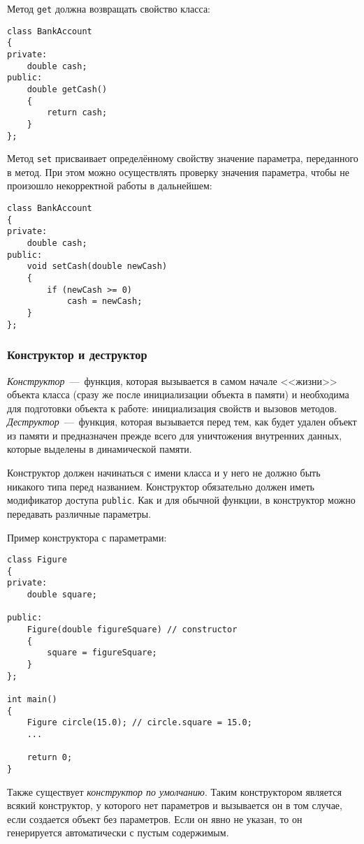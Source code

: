 Метод \lstinline|get| должна возвращать свойство класса:

\begin{lstlisting}
class BankAccount
{
private:
    double cash;
public:
    double getCash()
    {
        return cash;
    }
};
\end{lstlisting}

Метод \lstinline|set| присваивает определённому свойству значение параметра, переданного в метод. При этом можно осуществлять проверку значения параметра, чтобы не произошло некорректной работы в дальнейшем:

\begin{lstlisting}
class BankAccount
{
private:
    double cash;
public:
    void setCash(double newCash)
    {
        if (newCash >= 0)
            cash = newCash;
    }
};
\end{lstlisting}

\subsubsection{Конструктор и деструктор}
\label{subsubsec:ContstructorDestructor}
\emph{Конструктор}~---~функция, которая вызывается в самом начале <<жизни>> объекта класса (сразу же после инициализации объекта в памяти) и необходима для подготовки объекта к работе: инициализация свойств и вызовов методов. \emph{Деструктор}~---~функция, которая вызывается перед тем, как будет удален объект из памяти и предназначен прежде всего для уничтожения внутренних данных, которые выделены в динамической памяти.

Конструктор должен начинаться с имени класса и у него не должно быть никакого типа перед названием. Конструктор обязательно должен иметь модификатор доступа \lstinline|public|. Как и для обычной функции, в конструктор можно передавать различные параметры.

Пример конструктора с параметрами:

\begin{lstlisting}
class Figure
{
private:
    double square;

public:
    Figure(double figureSquare) // constructor
    {
        square = figureSquare;
    }
};

int main()
{
    Figure circle(15.0); // circle.square = 15.0;
    ...

    return 0;
}
\end{lstlisting}

Также существует \emph{конструктор по умолчанию}. Таким конструктором является всякий конструктор, у которого нет параметров и вызывается он в том случае, если создается объект без параметров. Если он явно не указан, то он генерируется автоматически с пустым содержимым.

